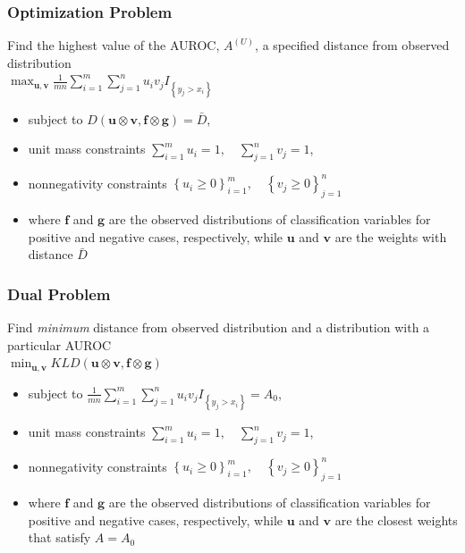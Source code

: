 \documentclass{beamer}
\begin{document}
\begin{frame}
\frametitle{Optimization Problem}


Find the highest value of the AUROC, $A^{(U)}$, a specified distance from observed distribution \\
$\max_{\mathbf{u}, \mathbf{v}} \frac{1}{m n} \sum_{i = 1}^{m} \sum_{j = 1}^{n} u_i v_j I_{\left\{ y_j > x_i \right\}}$
\begin{itemize}
    \item subject to
    $D(\mathbf{u} \otimes \mathbf{v}, \mathbf{f} \otimes \mathbf{g}) = \bar{D}$,
    \item unit mass constraints
    $\sum_{i = 1}^{m} u_i = 1, \quad \sum_{j = 1}^{n} v_j = 1$,
    \item nonnegativity constraints
    $ \left\{ u_i  \geq 0 \right\}_{i=1}^{m}, \quad \left\{ v_j \geq 0 \right\}_{j=1}^{n}$
    \item where $\mathbf{f}$ and $\mathbf{g}$ are the observed distributions of classification variables for positive and negative cases, respectively,
    while $\mathbf{u}$ and $\mathbf{v}$ are the weights with distance $\bar{D}$
\end{itemize}

\end{frame}


\begin{frame}
\frametitle{Dual Problem}

Find \emph{minimum} distance from observed distribution and a distribution with a particular AUROC \\
$\min_{\mathbf{u}, \mathbf{v}}
        KLD(\mathbf{u} \otimes \mathbf{v}, \mathbf{f} \otimes \mathbf{g})$
\begin{itemize}
    \item subject to
    $\frac{1}{m n} \sum_{i = 1}^{m} \sum_{j = 1}^{n} u_i v_j I_{\left\{ y_j > x_i \right\}} = A_0$,
    \item unit mass constraints
    $\sum_{i = 1}^{m} u_i = 1, \quad \sum_{j = 1}^{n} v_j = 1$,
    \item nonnegativity constraints
    $ \left\{ u_i  \geq 0 \right\}_{i=1}^{m}, \quad \left\{ v_j \geq 0 \right\}_{j=1}^{n}$
    \item where $\mathbf{f}$ and $\mathbf{g}$ are the observed distributions of classification variables for positive and negative cases, respectively,
    while $\mathbf{u}$ and $\mathbf{v}$ are the closest weights that satisfy $A = A_0$
\end{itemize}

\end{frame}
\end{document}

